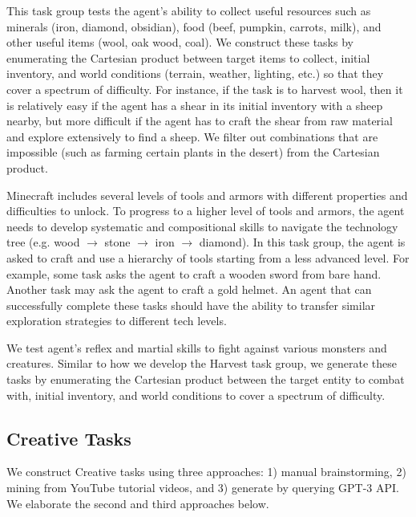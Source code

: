 This task group tests the agent's ability to collect useful resources such as minerals (iron, diamond, obsidian), food (beef, pumpkin, carrots, milk), and other useful items (wool, oak wood, coal). We construct these tasks by enumerating the Cartesian product between target items to collect, initial inventory, and world conditions (terrain, weather, lighting, etc.) so that they cover a spectrum of difficulty. 
For instance, if the task is to harvest wool, then it is relatively easy if the agent has a shear in its initial inventory with a sheep nearby, but more difficult if the agent has to craft the shear from raw material and explore extensively to find a sheep.
We filter out combinations that are impossible (such as farming certain plants in the desert) from the Cartesian product.

Minecraft includes several levels of tools and armors with different properties and difficulties to unlock. To progress to a higher level of tools and armors, the agent needs to develop systematic and compositional skills to navigate the technology tree (e.g. wood $\rightarrow$ stone $\rightarrow$ iron $\rightarrow$ diamond). 
In this task group, the agent is asked to craft and use a hierarchy of tools starting from a less advanced level. For example, some task asks the agent to craft a wooden sword from bare hand. Another task may ask the agent to craft a gold helmet. An agent that can successfully complete these tasks should have the ability to transfer similar exploration strategies to different tech levels.

We test agent's reflex and martial skills to fight against various monsters and creatures. Similar to how we develop the Harvest task group, we generate these tasks by enumerating the Cartesian product between the target entity to combat with, initial inventory, and world conditions to cover a spectrum of difficulty.


\subsection{Creative Tasks}
\label{supp:sec:creative_tasks}

We construct Creative tasks using three approaches: 1) manual brainstorming, 2) mining from YouTube tutorial videos, and 3) generate by querying GPT-3 API. We elaborate the second and third approaches below. 


